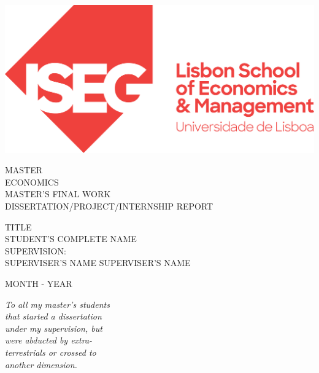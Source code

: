 \documentclass [12pt,a4paper,oneside]{article}
\begin{document}
\begin{titlepage}

\pagestyle{empty}
\centering

\begin{flushleft}
    \includegraphics[width=0.3\linewidth]{graphics/Logotipo_ISEG.pdf}
\end{flushleft}    
    \vspace{3cm}
    {\uppercase{\Large master}} \\ [0.5cm]
    {\uppercase{\Large economics}} \\ [2cm]%
    {\uppercase{\Large master's final work}} \\ [0.5cm]
  {\uppercase{\Large dissertation/project/internship report }} \\ [2cm] %
\begin{flushleft}
{\uppercase{\Large title }} \\ [1.5cm] %
{\uppercase{\Large student's complete name }}  \\ [2cm]%
{\uppercase{\Large supervision:}}  \\ [0.5cm]
{\uppercase{\Large superviser's name }}  %
{\uppercase{\Large superviser's name }}  %
\end{flushleft}
    \vfill
    {\uppercase{\Large  month - year}}  %
 \clearpage 
 \end{titlepage}


\thispagestyle{empty}%
\vspace*{\fill} %
\begin{flushright}
\textit{%
To all my master’s students\\
that started a dissertation\\
under my supervision, but\\
were abducted by extra-\\
terrestrials or crossed to\\
another dimension.
}
\end{flushright}
\end{document}
